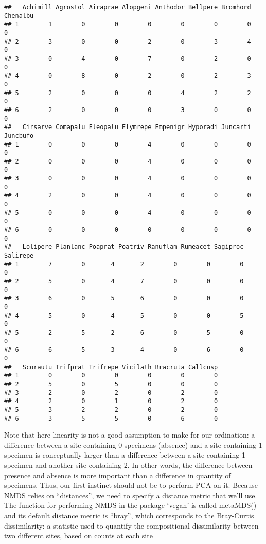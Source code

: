 \documentclass[
]{book}
\begin{document}
\begin{verbatim}
##   Achimill Agrostol Airaprae Alopgeni Anthodor Bellpere Bromhord Chenalbu
## 1        1        0        0        0        0        0        0        0
## 2        3        0        0        2        0        3        4        0
## 3        0        4        0        7        0        2        0        0
## 4        0        8        0        2        0        2        3        0
## 5        2        0        0        0        4        2        2        0
## 6        2        0        0        0        3        0        0        0
##   Cirsarve Comapalu Eleopalu Elymrepe Empenigr Hyporadi Juncarti Juncbufo
## 1        0        0        0        4        0        0        0        0
## 2        0        0        0        4        0        0        0        0
## 3        0        0        0        4        0        0        0        0
## 4        2        0        0        4        0        0        0        0
## 5        0        0        0        4        0        0        0        0
## 6        0        0        0        0        0        0        0        0
##   Lolipere Planlanc Poaprat Poatriv Ranuflam Rumeacet Sagiproc Salirepe
## 1        7        0       4       2        0        0        0        0
## 2        5        0       4       7        0        0        0        0
## 3        6        0       5       6        0        0        0        0
## 4        5        0       4       5        0        0        5        0
## 5        2        5       2       6        0        5        0        0
## 6        6        5       3       4        0        6        0        0
##   Scorautu Trifprat Trifrepe Vicilath Bracruta Callcusp
## 1        0        0        0        0        0        0
## 2        5        0        5        0        0        0
## 3        2        0        2        0        2        0
## 4        2        0        1        0        2        0
## 5        3        2        2        0        2        0
## 6        3        5        5        0        6        0
\end{verbatim}

Note that here linearity is not a good assumption to make for our ordination: a difference between a site containing 0 specimens (absence) and a site containing 1 specimen is conceptually larger than a difference between a site containing 1 specimen and another site containing 2. In other words, the difference between presence and absence is more important than a difference in quantity of specimens. Thus, our first instinct should not be to perform PCA on it. Because NMDS relies on ``distances'', we need to specify a distance metric that we'll use. The function for performing NMDS in the package `vegan' is called metaMDS() and its default distance metric is ``bray'', which corresponds to the Bray-Curtis dissimilarity: a statistic used to quantify the compositional dissimilarity between two different sites, based on counts at each site
\end{document}

